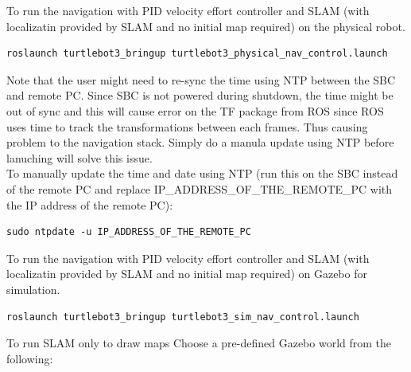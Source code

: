 \documentclass[12]{article}
\begin{document}
To run the navigation with PID velocity effort controller and SLAM (with localizatin provided by SLAM and no initial map required) on the physical robot. 
\begin{lstlisting}[style=bash]
roslaunch turtlebot3_bringup turtlebot3_physical_nav_control.launch 
\end{lstlisting}

Note that the user might need to re-sync the time using NTP between the SBC and remote PC. Since SBC is not powered during shutdown, 
the time might be out of sync and this will cause error on the TF package from ROS since ROS uses time to track the transformations between each frames. Thus causing problem to the navigation stack. 
Simply do a manula update using NTP before lanuching will solve this issue.\\
To manually update the time and date using NTP (run this on the SBC instead of the remote PC and replace IP\_ADDRESS\_OF\_THE\_REMOTE\_PC with the IP address of the remote PC):

\begin{lstlisting}[style=bash]
    sudo ntpdate -u IP_ADDRESS_OF_THE_REMOTE_PC
\end{lstlisting}

To run the navigation with PID velocity effort controller and SLAM (with localizatin provided by SLAM and no initial map required) on Gazebo for simulation.  
\begin{lstlisting}[style=bash]
roslaunch turtlebot3_bringup turtlebot3_sim_nav_control.launch 
\end{lstlisting}

To run SLAM only to draw maps
Choose a pre-defined Gazebo world from the following:
\end{document}

